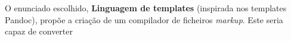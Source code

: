 \documentclass[../relatorio.tex]{subfiles}
\begin{document}
O enunciado escolhido, \textbf{Linguagem de templates} (inspirada nos templates Pandoc), propõe a criação de um 
compilador de ficheiros \textit{markup}.
Este seria capaz de converter 
\end{document}
